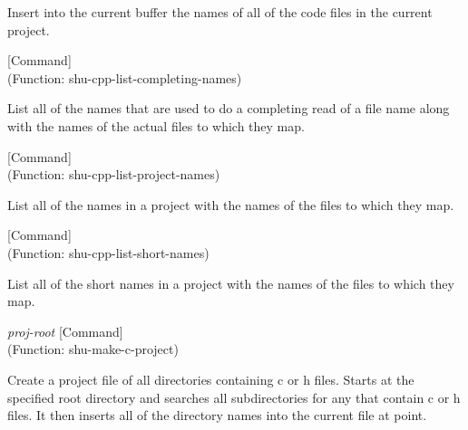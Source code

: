 \begin{doc-string}
Insert into the current buffer the names of all of the code files in the
current project.
\end{doc-string}

\vspace{1em}
\noindent
{}
\usebox{\funcname}
 \hfill [Command]\\%
 (Function: shu-cpp-list-completing-names)

\begin{doc-string}
List all of the names that are used to do a completing read of a file name
along with the names of the actual files to which they map.
\end{doc-string}

\vspace{1em}
\noindent
{}
\usebox{\funcname}
 \hfill [Command]\\%
 (Function: shu-cpp-list-project-names)

\begin{doc-string}
List all of the names in a project with the names of the files to
which they map.
\end{doc-string}

\vspace{1em}
\noindent
{}
\usebox{\funcname}
 \hfill [Command]\\%
 (Function: shu-cpp-list-short-names)

\begin{doc-string}
List all of the short names in a project with the names of the files to
which they map.
\end{doc-string}

\vspace{1em}
\noindent
{}
\usebox{\funcname}\emph{proj-root}
 \hfill [Command]\\%
 (Function: shu-make-c-project)

\begin{doc-string}
Create a project file of all directories containing c or h files.
Starts at the specified root directory and searches all subdirectories for
any that contain c or h files.  It then inserts all of the directory names
into the current file at point.
\end{doc-string}

